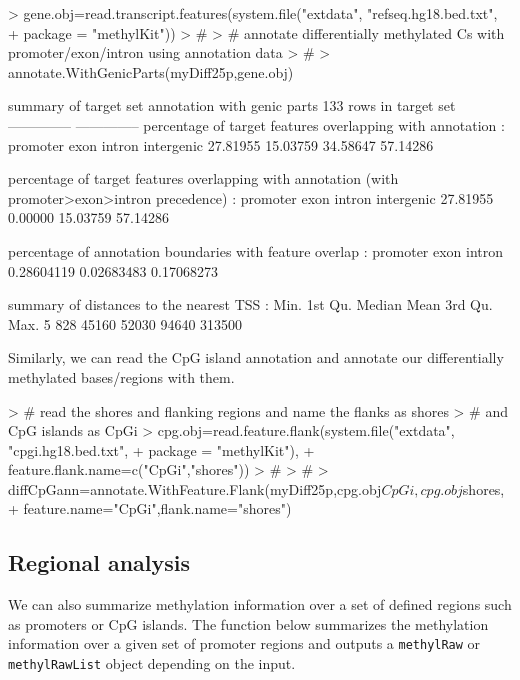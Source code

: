 \documentclass{article}
\begin{document}
\begin{Schunk}
\begin{Sinput}
> gene.obj=read.transcript.features(system.file("extdata", "refseq.hg18.bed.txt", 
+                                            package = "methylKit"))
> #
> # annotate differentially methylated Cs with promoter/exon/intron using annotation data
> #
> annotate.WithGenicParts(myDiff25p,gene.obj)
\end{Sinput}
\begin{Soutput}
summary of target set annotation with genic parts
133 rows in target set
--------------
--------------
percentage of target features overlapping with annotation :
  promoter       exon     intron intergenic 
  27.81955   15.03759   34.58647   57.14286 


percentage of target features overlapping with annotation (with promoter>exon>intron precedence) :
  promoter       exon     intron intergenic 
  27.81955    0.00000   15.03759   57.14286 


percentage of annotation boundaries with feature overlap :
  promoter       exon     intron 
0.28604119 0.02683483 0.17068273 


summary of distances to the nearest TSS :
   Min. 1st Qu.  Median    Mean 3rd Qu.    Max. 
      5     828   45160   52030   94640  313500 
\end{Soutput}
\end{Schunk}

Similarly, we can read the CpG island annotation and annotate our differentially methylated bases/regions with them.

\begin{Schunk}
\begin{Sinput}
> # read the shores and flanking regions and name the flanks as shores 
> # and CpG islands as CpGi
> cpg.obj=read.feature.flank(system.file("extdata", "cpgi.hg18.bed.txt", 
+                                         package = "methylKit"),
+                            feature.flank.name=c("CpGi","shores"))
> #
> #
> diffCpGann=annotate.WithFeature.Flank(myDiff25p,cpg.obj$CpGi,cpg.obj$shores,
+                                       feature.name="CpGi",flank.name="shores")
\end{Sinput}
\end{Schunk}


\subsection{Regional analysis}
We can also summarize methylation information over a set of defined regions such as promoters or CpG islands. The function below summarizes the methylation information over a given set of promoter regions and outputs a \texttt{methylRaw} or \texttt{methylRawList} object depending on the input.
\end{document}
